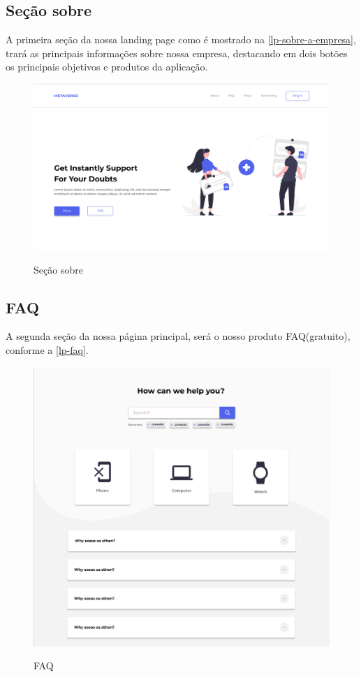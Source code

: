 \subsection{Seção sobre} 
    A primeira seção da nossa landing page como é mostrado na \autoref{lp-sobre-a-empresa}, trará as principais informações sobre nossa empresa, destacando em dois botões os principais objetivos e produtos da aplicação. 
    
    \begin{figure}[h]
        \caption{Seção sobre}
        \centering %
        \label{lp-sobre-a-empresa}
        \includegraphics[width=15cm]{LaTeX/metaversoIFSP/anexos/about-section.png} %
    \end{figure}
    
\subsection{FAQ}
    A segunda seção da nossa página principal, será o nosso produto FAQ(gratuito), conforme a \autoref{lp-faq}.
 
    \begin{figure}[!h]
        \caption{FAQ}
        \centering %
        \label{lp-faq}
        \includegraphics[width=15cm]{LaTeX/metaversoIFSP/anexos/faq.png} %
    \end{figure}
\newpage
